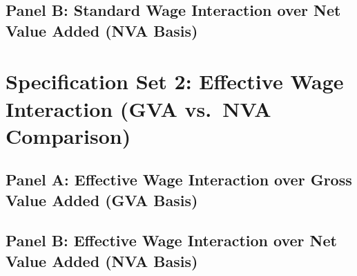 \documentclass[11pt,a4paper]{article}
\begin{document}
\FloatBarrier
\subsection{Panel B: Standard Wage Interaction over Net Value Added (NVA Basis)}
\FloatBarrier


\FloatBarrier
\section{Specification Set 2: Effective Wage Interaction (GVA vs.\ NVA Comparison)}

\subsection{Panel A: Effective Wage Interaction over Gross Value Added (GVA Basis)}
\FloatBarrier


\FloatBarrier
\subsection{Panel B: Effective Wage Interaction over Net Value Added (NVA Basis)}
\FloatBarrier

\end{document}
